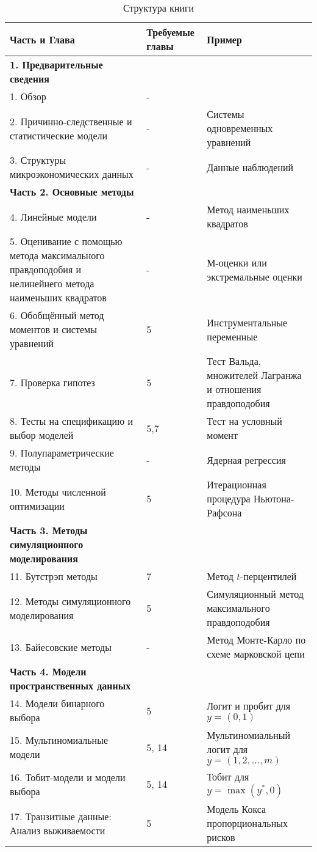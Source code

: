 \begin{table}[h]
\begin{center}
\caption{\label{tab:bookstructure}Структура книги}
\begin{tabular}{p{8cm}p{1cm}p{6cm}}
\hline
\hline
Часть и Глава  & Требуемые главы & Пример \\
\hline
\textbf{1. Предварительные сведения} & & \\
1. Обзор & - & \\
2. Причинно-следственные и статистические модели & - & Системы одновременных уравнений \\
3. Структуры микроэкономических данных & - & Данные наблюдений \\
\textbf{Часть 2. Основные методы} & & \\
4. Линейные модели & - & Метод наименьших квадратов \\
5. Оценивание с помощью метода максимального правдоподобия и
нелинейнего метода наименьших квадратов & - & М-оценки или экстремальные оценки \\
6. Обобщённый метод моментов и системы уравнений & 5 & Инструментальные переменные \\
7. Проверка гипотез & 5 & Тест Вальда, множителей Лагранжа и отношения правдоподобия \\
8. Тесты на спецификацию и выбор моделей & 5,7 & Тест на условный момент \\
9. Полупараметрические методы & - & Ядерная регрессия \\
10. Методы численной оптимизации & 5 & Итерационная процедура Ньютона-Рафсона \\
\textbf{Часть 3. Методы симуляционного моделирования} & & \\
11. Бутстрэп методы & 7 & Метод $t$-перцентилей \\
12. Методы симуляционного моделирования & 5 & Симуляционный метод максимального правдоподобия \\
13. Байесовские методы & - & Метод Монте-Карло по схеме марковской цепи \\
\textbf{Часть 4. Модели пространственных данных} & & \\
14. Модели бинарного выбора & 5 & Логит и пробит для $y=(0,1)$ \\
15. Мультиномиальные модели & 5, 14 & Мультиномиальный логит для $y=(1,2,\ldots, m)$ \\
16. Тобит-модели и модели выбора & 5, 14 & Тобит для $y=\max(y^*,0)$ \\
17. Транзитные данные: Анализ выживаемости & 5 & Модель Кокса пропорциональных рисков \\

\end{tabular}
\end{center}
\end{table}
